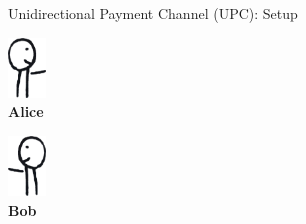 \documentclass[]{beamer}
\begin{document}
\begin{frame}{Unidirectional Payment Channel (UPC): Setup}
\begin{minipage}{0.1\linewidth}
		\vspace{-0.5cm}
		\centering
		\includegraphics[width=1cm]{../assets/images/agents/handing_right}
		\\ \hspace{-0.35cm} \textbf{Alice}
	\end{minipage}%
	\begin{minipage}{0.8\linewidth}
		\begin{figure}
		\begin{tikzpicture}[scale=0.9, every node/.style={scale=0.9}]
			
		\end{tikzpicture}
		\vspace{0.5cm}
		\end{figure}
	\end{minipage}%
	\begin{minipage}{0.1\linewidth}
		\vspace{-0.5cm}
		\centering
		\includegraphics[width=1cm]{../assets/images/agents/handing_left}
		\\ \hspace{0.3cm}\textbf{Bob}
	\end{minipage}

\end{frame}
\end{document}
